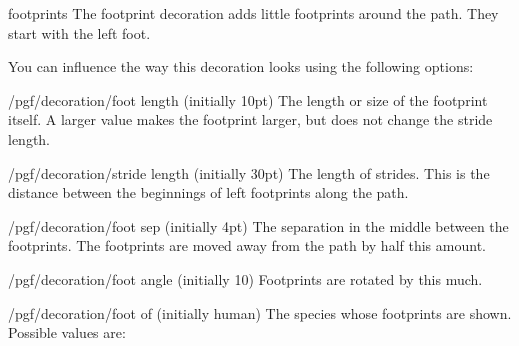 \begin{decoration}{footprints}
  The footprint decoration adds little footprints around the
  path. They start with the left foot.
\begin{codeexample}[]
\end{codeexample}
  You can influence the way this decoration looks using the following
  options:
  \begin{key}{/pgf/decoration/foot length (initially 10pt)}
    The length or size of the footprint itself. A larger value makes
    the footprint larger, but does not change the stride length.
\begin{codeexample}[]
\end{codeexample}
  \end{key}
  \begin{key}{/pgf/decoration/stride length (initially 30pt)}
    The length of strides. This is the distance between the beginnings
    of left footprints along the path.
\begin{codeexample}[]
\end{codeexample}
  \end{key}
  \begin{key}{/pgf/decoration/foot sep (initially 4pt)}
    The separation in the middle between the footprints. The
    footprints are moved away from the path by half this amount.
\begin{codeexample}[]
\end{codeexample}
  \end{key}
  \begin{key}{/pgf/decoration/foot angle (initially 10)}
    Footprints are rotated by this much.
\begin{codeexample}[]
\end{codeexample}
  \end{key}
  \begin{key}{/pgf/decoration/foot of (initially human)}
    The species whose footprints are shown. Possible values are:


\end{key}
\end{decoration}
